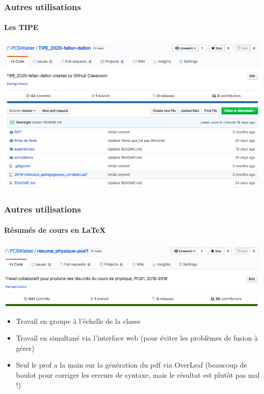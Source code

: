 \begin{frame}
	\frametitle{Autres utilisations}
	\framesubtitle{Les TIPE}

	\begin{center}
		\includegraphics[width=\linewidth]{figures/TIPE1.png}
	\end{center}

\end{frame}


\begin{frame}
	\frametitle{Autres utilisations}
	\framesubtitle{Résumés de cours en \LaTeX}

	\begin{center}
		\includegraphics[width=\linewidth]{figures/resumes_physique.png}
	\end{center}
	\begin{itemize}[<+->]
		\item Travail en groupe à l'échelle de la classe

		\item Travail en simultané via l'interface web (pour éviter les problèmes de fusion à gérer)

		\item Seul le prof a la main sur la génération du pdf via OverLeaf (beaucoup de boulot pour corriger les erreurs de syntaxe, mais le résultat est plutôt pas mal !)
	\end{itemize}
\end{frame}

